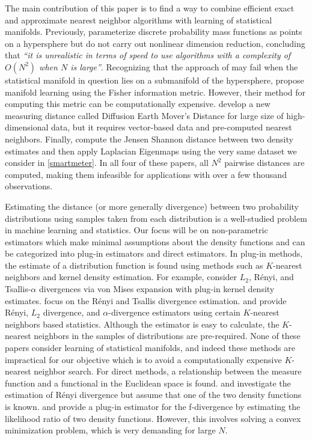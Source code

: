 \documentclass{article}
\begin{document}
The main contribution of this paper is to find a way to combine
efficient exact and approximate nearest neighbor algorithms with
learning of statistical manifolds. Previously, \citet{Lee2007-qa}
parameterize discrete probability mass functions as points on a
hypersphere but do not carry out nonlinear dimension reduction,
concluding that \emph{``it is unrealistic in terms of speed to use
algorithms with a complexity of \(O(N^2)\) when \(N\) is large''}.
Recognizing that the approach of \citet{Lee2007-qa} may fail when the
statistical manifold in question lies on a submanifold of the
hypersphere, \citet{Carter2009-ti} propose manifold learning using the
Fisher information metric. However, their method for computing this
metric can be computationally expensive. \citet{Tong2021-ps} develop a
new measuring distance called Diffusion Earth Mover's Distance for large
size of high-dimensional data, but it requires vector-based data and
pre-computed nearest neighbors. Finally, \citet{Hyndman2018-ia} compute
the Jensen Shannon distance between two density estimates and then apply
Laplacian Eigenmaps using the very same dataset we consider in
\autoref{smartmeter}. In all four of these papers, all \(N^2\) pairwise
distances are computed, making them infeasible for applications with
over a few thousand observations.

Estimating the distance (or more generally divergence) between two
probability distributions using samples taken from each distribution is
a well-studied problem in machine learning and statistics. Our focus
will be on non-parametric estimators which make minimal assumptions
about the density functions and can be categorized into plug-in
estimators and direct estimators. In plug-in methods, the estimate of a
distribution function is found using methods such as \(K\)-nearest
neighbors and kernel density estimation. For example,
\citet{Kandasamy2015-iw} consider \(L_2\), Rényi, and Tsallis-\(\alpha\)
divergences via von Mises expansion with plug-in kernel density
estimates. \citet{Poczos2011-wa} focus on the Rényi and Tsallis
divergence estimation. \citet{Poczos2011-wa} and \citet{Poczos2012-ng}
provide Rényi, \(L_2\) divergence, and \(\alpha\)-divergence estimators
using certain \(K\)-nearest neighbors based statistics. Although the
estimator is easy to calculate, the \(K\)-nearest neighbors in the
samples of distributions are pre-required. None of these papers consider
learning of statistical manifolds, and indeed these methods are
impractical for our objective which is to avoid a computationally
expensive \(K\)-nearest neighbor search. For direct methods, a
relationship between the measure function and a functional in the
Euclidean space is found. \citet{Hero2001-pc} and \citet{Hero2002-ik}
investigate the estimation of Rényi divergence but assume that one of
the two density functions is known. \citet{Nguyen2009-fi} and
\citet{Nguyen2010-gc} provide a plug-in estimator for the f-divergence
by estimating the likelihood ratio of two density functions. However,
this involves solving a convex minimization problem, which is very
demanding for large \(N\).
\end{document}
